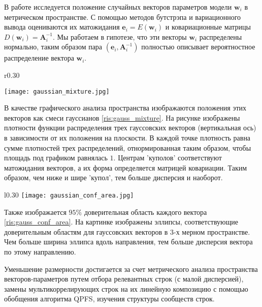 \documentclass{article}
\begin{document}

В работе исследуется положение случайных векторов параметров модели $\mathbf{w}_i$ в метрическом пространстве. С помощью методов бутстрэпа и вариационного вывода \citep{hastie2009elements} оцениваются их матожидания $\mathbf{e}_i=E(\mathbf{w}_i)$ и ковариационные матрицы $D(\mathbf{w}_i) = \mathbf{A}^{-1}_i$. Мы работаем в гипотезе, что эти векторы $\mathbf{w}_i$ распределены нормально, таким образом пара $(\mathbf{e}_i, \mathbf{A}^{-1}_i)$ полностью описывает вероятностное распределение вектора $\mathbf{w}_i$. 

\begin{wrapfigure}{r}{0.30\textwidth}

\texttt{[image: gaussian\_mixture.jpg]}
\caption{Смесь гауссианов трех 2-х мерных векторов.}
\label{ris:gauss_mixture}

\end{wrapfigure}
В качестве графического анализа пространства изображаются положения этих векторов как смеси гауссианов \ref{ris:gauss_mixture}.  На рисунке изображены плотности функции распределения трех гауссовских векторов (вертикальная ось) в зависимости от их положения на плоскости. В каждой точке плотность равна сумме плотностей трех распределений, отнормированная таким образом, чтобы площадь под графиком равнялась $1$. Центрам 'куполов' соответствуют матожидания векторов, а их форма определяется матрицей ковариации. Таким образом, чем ниже и шире 'купол', тем больше дисперсия и наоборот.

\begin{wrapfigure}{l}{0.30\textwidth}
\texttt{[image: gaussian\_conf\_area.jpg]}
\caption{Доверительные области 3-х мерных векторов.}
\label{ris:gauss_conf_area}
\end{wrapfigure}
Также изображается $95\%$ доверительная область каждого вектора \ref{ris:gauss_conf_area}. На картинке изображены эллипсы, соответствующие доверительным областям для гауссовских векторов в 3-х мерном пространстве. Чем больше ширина эллипса вдоль направления, тем больше дисперсия вектора по этому направлению.


Уменьшение размерности достигается за счет метрического анализа пространства векторов-параметров путем отбора релевантных строк (с малой дисперсией), замены мультикоррелирующих строк на их линейную композицию с помощью обобщения алгоритма QPFS, изучения структуры сообществ строк.
\end{document}
